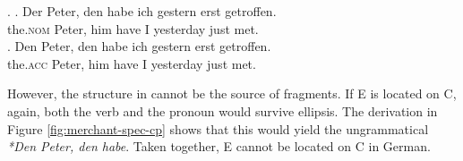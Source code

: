 \ex. \ag. Der Peter, den habe ich gestern erst getroffen.\\
	  the.\textsc{nom} Peter, him have I yesterday just met.\\
     \bg. Den Peter, den habe ich gestern erst getroffen.\\
     	  the.\textsc{acc} Peter, him have I yesterday just met.\\

However, the structure in \Last[b] cannot be the source of fragments. If E is located on C, again, both the verb and the pronoun would survive ellipsis. The derivation in Figure \ref{fig:merchant-spec-cp} shows that this would yield the ungrammatical \textit{*Den Peter, den habe}. Taken together, E cannot be located on C in German.

